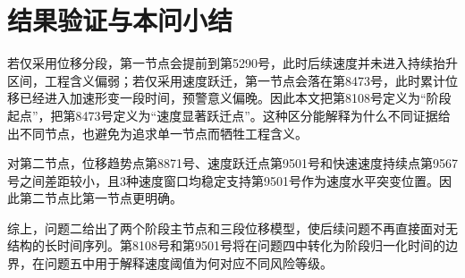 \section{结果验证与本问小结}

若仅采用位移分段，第一节点会提前到第5290号，此时后续速度并未进入持续抬升区间，工程含义偏弱；若仅采用速度跃迁，第一节点会落在第8473号，此时累计位移已经进入加速形变一段时间，预警意义偏晚。因此本文把第8108号定义为“阶段起点”，把第8473号定义为“速度显著跃迁点”。这种区分能解释为什么不同证据给出不同节点，也避免为追求单一节点而牺牲工程含义。

对第二节点，位移趋势点第8871号、速度跃迁点第9501号和快速速度持续点第9567号之间差距较小，且3种速度窗口均稳定支持第9501号作为速度水平突变位置。因此第二节点比第一节点更明确。

综上，问题二给出了两个阶段主节点和三段位移模型，使后续问题不再直接面对无结构的长时间序列。第8108号和第9501号将在问题四中转化为阶段归一化时间的边界，在问题五中用于解释速度阈值为何对应不同风险等级。
